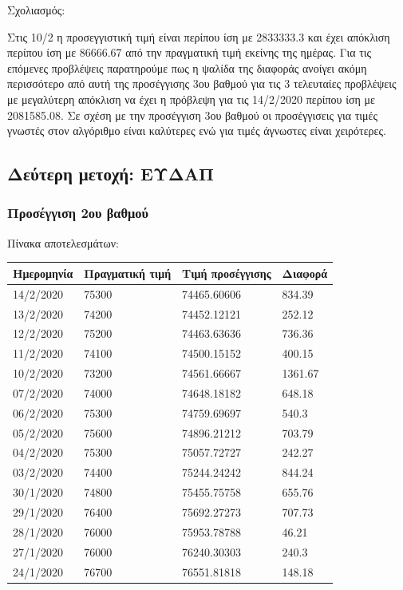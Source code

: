 \documentclass[a4paper,11pt]{article}
\begin{document}
	Σχολιασμός:
	\hfill \break
	
	Στις 10/2 η προσεγγιστική τιμή είναι περίπου ίση με 2833333.3 και έχει απόκλιση περίπου ίση με 86666.67 από την πραγματική τιμή εκείνης της ημέρας. Για τις επόμενες προβλέψεις
	παρατηρούμε πως η ψαλίδα της διαφοράς ανοίγει ακόμη περισσότερο από αυτή της προσέγγισης 3ου βαθμού για τις 3 τελευταίες προβλέψεις με μεγαλύτερη απόκλιση να έχει η πρόβλεψη για τις 14/2/2020 περίπου ίση με 2081585.08. Σε σχέση με την προσέγγιση 3ου βαθμού οι προσέγγισεις για τιμές γνωστές στον αλγόριθμο είναι καλύτερες ενώ για τιμές άγνωστες είναι χειρότερες.
	

	\subsection{Δεύτερη μετοχή:
	ΕΥΔΑΠ}\label{ux3c0ux3c1ux3ceux3c4ux3b7-ux3bcux3b5ux3c4ux3bfux3c7ux3ae-ux3baux3b1ux3c1ux3b5ux3bb}
	
	\subsubsection{Προσέγγιση 2ου βαθμού}
	
	Πίνακα αποτελεσμάτων:
	
	\begin{tabular}{| l | l | l | l |}
		\hline
		Ημερομηνία & Πραγματική τιμή & Τιμή προσέγγισης & Διαφορά
		\\ \hline
		14/2/2020 & 75300 & 74465.60606 & 834.39
		\\ \hline
		13/2/2020 & 74200 & 74452.12121 & 252.12
		\\ \hline
		12/2/2020 & 75200 & 74463.63636 & 736.36
		\\ \hline
		11/2/2020 & 74100 & 74500.15152 & 400.15
		\\ \hline
		10/2/2020 & 73200 & 74561.66667 & 1361.67
		\\ \hline
		07/2/2020 & 74000 & 74648.18182 & 648.18
		\\ \hline
		06/2/2020 & 75300 & 74759.69697 & 540.3
		\\ \hline
		05/2/2020 & 75600 & 74896.21212 & 703.79
		\\ \hline
		04/2/2020 & 75300 & 75057.72727 & 242.27
		\\ \hline
		03/2/2020 & 74400 & 75244.24242 & 844.24
		\\ \hline
		30/1/2020 & 74800 & 75455.75758 & 655.76
		\\ \hline
		29/1/2020 & 76400 & 75692.27273 & 707.73
		\\ \hline
		28/1/2020 & 76000 & 75953.78788 & 46.21
		\\ \hline
		27/1/2020 & 76000 & 76240.30303 & 240.3
		\\ \hline
		24/1/2020 & 76700 & 76551.81818 & 148.18
		\\ \hline
	\end{tabular}
\end{document}
